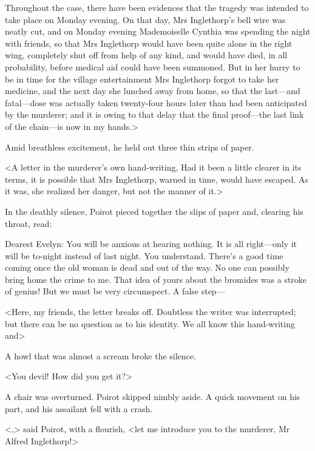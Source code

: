  Throughout the case, there have been evidences that the tragedy was intended to take place on Monday evening. On that day, Mrs Inglethorp's bell wire was neatly cut, and on Monday evening Mademoiselle Cynthia was spending the night with friends, so that Mrs Inglethorp would have been quite alone in the right wing, completely shut off from help of any kind, and would have died, in all probability, before medical aid could have been summoned. But in her hurry to be in time for the village entertainment Mrs Inglethorp forgot to take her medicine, and the next day she lunched away from home, so that the last—and fatal—dose was actually taken twenty-four hours later than had been anticipated by the murderer; and it is owing to that delay that the final proof—the last link of the chain—is now in my hands.> 

 Amid breathless excitement, he held out three thin strips of paper. 

 <A letter in the murderer's own hand-writing,  Had it been a little clearer in its terms, it is possible that Mrs Inglethorp, warned in time, would have escaped. As it was, she realized her danger, but not the manner of it.> 

 In the deathly silence, Poirot pieced together the slips of paper and, clearing his throat, read: 
 \begin{mail}{}{Dearest Evelyn:}
 You will be anxious at hearing nothing. It is all right—only it will be to-night instead of last night. You understand. There's a good time coming once the old woman is dead and out of the way. No one can possibly bring home the crime to me. That idea of yours about the bromides was a stroke of genius! But we must be very circumspect. A false step—
 \end{mail}

 <Here, my friends, the letter breaks off. Doubtless the writer was interrupted; but there can be no question as to his identity. We all know this hand-writing and\longdash> 

 A howl that was almost a scream broke the silence. 

 <You devil! How did you get it?> 

 A chair was overturned. Poirot skipped nimbly aside. A quick movement on his part, and his assailant fell with a crash. 

 <,> said Poirot, with a flourish, <let me introduce you to the murderer, Mr Alfred Inglethorp!>